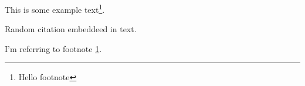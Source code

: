 \documentclass{article}
\begin{document}
This is some example text\footnote{\label{myfootnote}Hello footnote}.

Random citation \autocite{DUMMY:1} embeddeed in text.

\newpage

\printbibliography

I'm referring to footnote \ref{myfootnote}.
\end{document}
